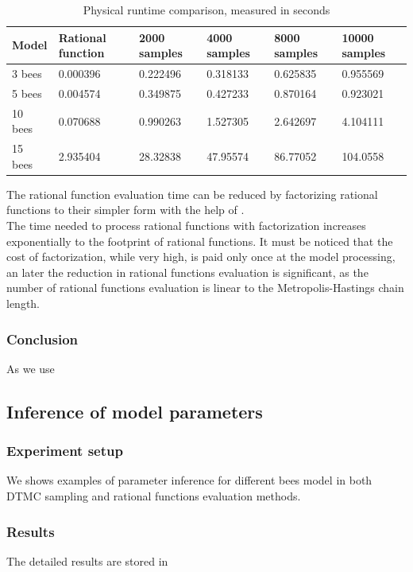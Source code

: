 \documentclass[12pt]{article}
\theoremstyle{definition}
\begin{document}
\begin{table}[H]
  \begin{tabular}{|l|l|l|l|l|l|}
    \hline
    Model   & Rational function  & 2000 samples & 4000 samples  & 8000 samples  & 10000 samples  \\ \hline
    3 bees  & 0.000396   & 0.222496  & 0.318133 & 0.625835 & 0.955569 \\ \hline
    5 bees  & 0.004574   & 0.349875  & 0.427233 & 0.870164 & 0.923021 \\ \hline
    10 bees & 0.070688   & 0.990263  & 1.527305 & 2.642697 & 4.104111 \\ \hline
    15 bees & 2.935404   & 28.32838  & 47.95574 & 86.77052 & 104.0558 \\ \hline
  \end{tabular}
  \caption{Physical runtime comparison, measured in seconds}
\end{table}

The rational function evaluation time can be
reduced by factorizing rational functions to their simpler form with the help of
\cite{meurer2017sympy}. \\

The time needed to process rational functions with factorization
increases exponentially to the footprint of rational functions. It must be
noticed that the cost of factorization, while very high, is paid only once at
the model processing, an later the reduction in rational functions evaluation is
significant, as the number of rational functions evaluation is linear to the
Metropolis-Hastings chain length.

\subsubsection{Conclusion}
As we use 


\subsection{Inference of model parameters}
\subsubsection{Experiment setup}
We shows examples of parameter inference for different bees model in both DTMC
sampling and rational functions evaluation methods.

\subsubsection{Results}
The detailed results are stored in
\end{document}
